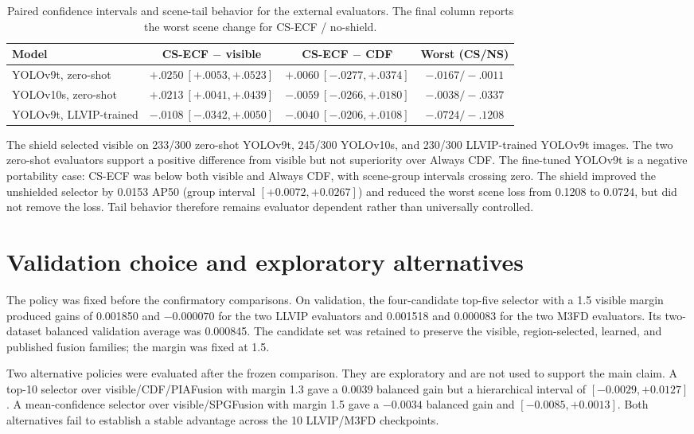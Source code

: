 \documentclass[11pt]{article}
\begin{document}
\begin{table}[ht]
\centering
\scriptsize
\setlength{\tabcolsep}{3pt}
\caption{Paired confidence intervals and scene-tail behavior for the external
evaluators. The final column reports the worst scene change for CS-ECF /
no-shield.}
\begin{tabular}{@{}lccc@{}}
\toprule
Model & CS-ECF \(-\) visible & CS-ECF \(-\) CDF & Worst (CS/NS) \\
\midrule
YOLOv9t, zero-shot & \(+.0250~[+.0053,+.0523]\) &
  \(+.0060~[-.0277,+.0374]\) & \(-.0167 / -.0011\) \\
YOLOv10s, zero-shot & \(+.0213~[+.0041,+.0439]\) &
  \(-.0059~[-.0266,+.0180]\) & \(-.0038 / -.0337\) \\
YOLOv9t, LLVIP-trained & \(-.0108~[-.0342,+.0050]\) &
  \(-.0040~[-.0206,+.0108]\) & \(-.0724 / -.1208\) \\
\bottomrule
\end{tabular}
\end{table}

The shield selected visible on 233/300 zero-shot YOLOv9t, 245/300 YOLOv10s,
and 230/300 LLVIP-trained YOLOv9t images. The two zero-shot evaluators support
a positive difference from visible but not superiority over Always CDF. The
fine-tuned YOLOv9t is a negative portability case: CS-ECF was below both
visible and Always CDF, with scene-group intervals crossing zero. The shield
improved the unshielded selector by 0.0153 AP50 (group interval
\([+0.0072,+0.0267]\)) and reduced the worst scene loss from 0.1208 to 0.0724,
but did not remove the loss. Tail behavior therefore remains evaluator
dependent rather than universally controlled.

\section{Validation choice and exploratory alternatives}

The policy was fixed before the confirmatory comparisons. On validation, the
four-candidate top-five selector with a 1.5 visible margin produced gains of
0.001850 and \(-0.000070\) for the two LLVIP evaluators and 0.001518 and
0.000083 for the two M3FD evaluators. Its two-dataset balanced validation
average was 0.000845. The candidate set was retained to preserve the visible,
region-selected, learned, and published fusion families; the margin was fixed
at 1.5.

Two alternative policies were evaluated after the frozen comparison. They are
exploratory and are not used to support the main claim. A top-10 selector over
visible/CDF/PIAFusion with margin 1.3 gave a 0.0039 balanced gain but a
hierarchical interval of \([-0.0029,+0.0127]\). A mean-confidence selector over
visible/SPGFusion with margin 1.5 gave a \(-0.0034\) balanced gain and
\([-0.0085,+0.0013]\). Both alternatives fail to establish a stable advantage
across the 10 LLVIP/M3FD checkpoints.
\end{document}
